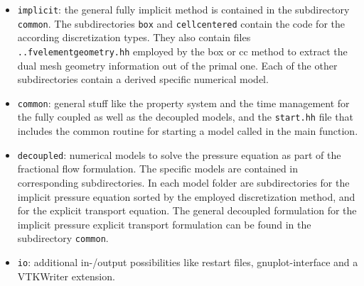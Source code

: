 \begin{itemize} 

\item \texttt{implicit}:
the general fully implicit method is contained in the subdirectory \texttt{common}. 
The subdirectories \texttt{box} and \texttt{cellcentered} contain the code for the according 
discretization types. They also contain files \texttt{..fvelementgeometry.hh} employed 
by the box or cc method to extract the dual mesh geometry information out of the primal one. 
Each of the other subdirectories contain a derived specific numerical model. 

\item \texttt{common}:
general stuff like the property system and the time management for the 
fully coupled as well as the decoupled models, 
and the \texttt{start.hh} file that includes the common routine for starting a model called in the main function. 

\item \texttt{decoupled}:
 numerical models to solve the pressure equation as part of the fractional flow formulation. The specific models are contained 
 in corresponding subdirectories. In each model folder are subdirectories for the implicit pressure equation sorted by the employed discretization method, and for the explicit transport equation. The general decoupled formulation for the implicit pressure explicit transport formulation can be found in the subdirectory \texttt{common}.




\item \texttt{io}: additional in-/output possibilities like restart files, gnuplot-interface 
and a VTKWriter extension. 


\end{itemize}
